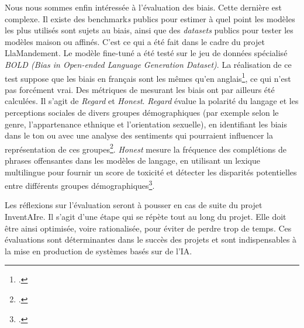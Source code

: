 Nous nous sommes enfin intéressée à l'évaluation des biais.
Cette dernière est complexe. Il existe des \gls{benchmark}\textit{s} publics pour estimer à quel point les modèles les plus utilisés
sont sujets au biais, ainsi que des \emph{datasets} publics pour tester les modèles maison ou affinés. C'est ce qui a été fait dans le cadre du projet
LlaMandement. Le modèle fine-tuné a été testé sur le jeu de données spécialisé \emph{BOLD (Bias in Open-ended Language Generation Dataset)}.
La réalisation de ce test suppose que les biais en français sont les mêmes qu'en anglais\footcite{gesnouin_llamandement_2024}, ce qui n'est pas forcément vrai.
Des métriques de mesurant les biais ont par ailleurs été calculées. Il s'agit de \emph{Regard} et \emph{Honest}. 
\emph{Regard} évalue la polarité du langage et les perceptions sociales de divers groupes démographiques 
(par exemple selon le genre, l'appartenance ethnique et l'orientation sexuelle), en identifiant les biais dans le ton 
ou avec une analyse des sentiments qui pourraient influencer la représentation de ces groupes\footcite{gesnouin_llamandement_2024}.
 \emph{Honest} mesure la fréquence des complétions de phrases offensantes dans les modèles de langage,
  en utilisant un lexique multilingue pour fournir un score de toxicité et détecter les disparités potentielles entre différents groupes démographiques\footcite{gesnouin_llamandement_2024}.
\newline

Les réflexions sur l'évaluation seront à pousser en cas de suite du projet InventAIre. 
Il s'agit d'une étape qui se répète tout au long du projet. Elle doit être ainsi optimisée, voire rationalisée, pour éviter de perdre trop de temps.
 Ces évaluations sont déterminantes dans le succès des projets et sont indispensables à la mise en production de systèmes basés sur de l'IA.


